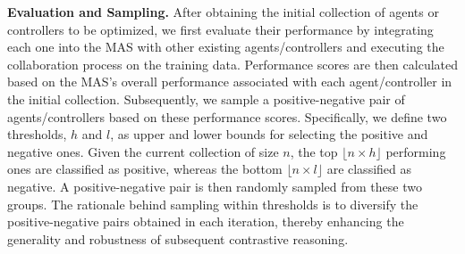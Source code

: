 


\noindent \textbf{Evaluation and Sampling.} After obtaining the initial collection of agents or controllers to be optimized, we first evaluate their performance by integrating each one into the MAS with other existing agents/controllers and executing the collaboration process on the training data. 
Performance scores are then calculated based on the MAS's overall performance associated with each agent/controller in the initial collection. 
Subsequently, we sample a positive-negative pair of agents/controllers based on these performance scores. Specifically, we define two thresholds, $h$ and $l$, as upper and lower bounds for selecting the positive and negative ones.
Given the current collection of size $n$, the top $\lfloor n \times h \rfloor$ performing ones are classified as positive, whereas the bottom $\lfloor n \times l \rfloor$ are classified as negative. A positive-negative pair is then randomly sampled from these two groups. The rationale behind sampling within thresholds is to diversify the positive-negative pairs obtained in each iteration, thereby enhancing the generality and robustness of subsequent contrastive reasoning.

